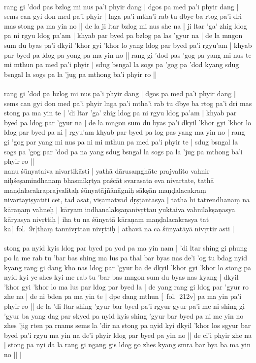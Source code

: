 \documentclass[12pt]{article}
\begin{document}
\textbf{\TVA}\\
rang gi 'dod pas bzlog mi nus pa'i phyir dang | dgos pa med pa'i phyir dang | sems can gyi don med pa'i phyir | lnga pa'i mtha'i rab tu dbye ba rtog pa'i dri mas stong pa ma yin no || de la ji ltar bzlog mi nus she na | ji ltar 'ga' zhig ldog pa ni rgyu ldog pa'am | khyab par byed pa bzlog pa las 'gyur na | de la mngon sum du byas pa'i dkyil 'khor gyi 'khor lo yang ldog par byed pa'i rgyu'am | khyab par byed pa ldog pa yong pa ma yin no || rang gi 'dod pas 'gog pa yang mi nus te mi mthun pa med pa'i phyir | sdug bsngal la sogs pa 'gog pa 'dod kyang sdug bsngal la sogs pa la 'jug pa mthong ba'i phyir ro || \\

\textbf{\TVB}\\
rang gi 'dod pa bzlog mi nus pa'i phyir dang | dgos pa med pa'i phyir dang | sems can gyi don med pa'i phyir lnga pa'i mtha'i rab tu dbye ba rtog pa'i dri mas stong pa ma yin te | 'di ltar 'ga' zhig ldog pa ni rgyu ldog pa'am | khyab par byed pa ldog par 'gyur na | de la mngon sum du byas pa'i dkyil 'khor gyi 'khor lo ldog par byed pa ni | rgyu'am khyab par byed pa log pas yang ma yin no | rang gi 'gog par yang mi nus pa ni mi mthun pa med pa'i phyir te | sdug bsngal la sogs pa 'gog par 'dod pa na yang sdug bsngal la sogs pa la 'jug pa mthong ba'i phyir ro || \\

nanu śūnyataiva nivartikāsti | yathā dārusaṃghāte prajvalito vahnir niḥśeṣamindhanaṃ bhasmīkṛtya paścāt svarasata eva nivartate, tathā maṇḍalacakraprajvalitaḥ śūnyatājñānāgniḥ sākṣān maṇḍalacakraṃ nivartayiṣyatīti cet, tad asat, viṣamatvād dṛṣṭāntasya | tathā hi tatrendhanaṃ na kāraṇaṃ vahneḥ | kāryam indhanalakṣaṇanivṛttau yuktaiva vahnilakṣaṇasya kāryasya nivṛttiḥ | iha tu na śūnyatā kāraṇaṃ maṇḍalacakrasya tat ka[\MS\ fol.\ 9r]thaṃ tannivṛttau nivṛttiḥ | athavā na ca śūnyatāyā nivṛttir asti |\\

\textbf{\TVA}\\
stong pa nyid kyis ldog par byed pa yod pa ma yin nam | 'di ltar shing gi phung po la me rab tu 'bar bas shing ma lus pa thal bar byas nas de'i 'og tu bdag nyid kyang rang gi dang kho nas ldog par 'gyur ba de dkyil 'khor gyi 'khor lo stong pa nyid kyi ye shes kyi me rab tu 'bar bas mngon sum du byas nas kyang | dkyil 'khor gyi 'khor lo ma lus par ldog par byed la | de yang rang gi ldog par 'gyur ro zhe na | de ni bden pa ma yin te | dpe dang mthun [\TVA\ fol.\ 212v] pa ma yin pa'i phyir ro || de la 'di ltar shing 'gyur bar byed pa'i rgyur gyur pa'i me ni shing gi 'gyur ba yang dag par skyed pa nyid kyis shing 'gyur bar byed pa ni me yin no zhes 'jig rten pa rnams sems la 'dir na stong pa nyid kyi dkyil 'khor los sgyur bar byed pa'i rgyu ma yin na de'i phyir ldog par byed pa yin no || de ci'i phyir zhe na | stong pa nyi da la rang gi ngang gis ldog go zhes kyang smra bar bya ba ma yin no ||  |\\
\end{document}
